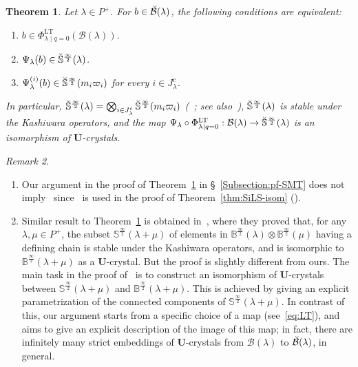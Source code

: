 \documentclass[10pt]{amsart}
\newtheorem{theo}{Theorem}[section]
\theoremstyle{definition}\newtheorem{defi}[theo]{Definition}
\theoremstyle{remark}\newtheorem{rema}[theo]{Remark}
\newcommand{\U}{\mathbf{U}}
\newcommand{\si}{\frac{\infty}{2}}
\DeclareMathOperator{\LT}{LT}
\begin{document}
\goodbreak
\begin{theo} \label{thm:SMT}
Let $\lambda \in P^+$. 
For $b \in \Breve{\mathcal{B}}(\lambda)$, 
the following conditions are equivalent:
\begin{enumerate}[label=(\arabic*)]
\item\label{Theo3.4_1}
$b \in \Phi_{\lambda \mid q=0}^{\LT }(\mathcal{B}(\lambda))$.
\item\label{Theo3.4_2}
$\Psi_{\lambda}(b) \in \Breve{\mathbb{S}}^{\si}(\lambda)$. 
\item\label{Theo3.4_3}
$\Psi_{\lambda}^{(i)}(b) \in \Breve{\mathbb{S}}^{\si}(m_i \varpi_i)$
for every $i \in J_{\lambda}^c$.
\end{enumerate}
In particular, 
$\Breve{\mathbb{S}}^{\si}(\lambda) = \bigotimes_{i \in J_{\lambda}^c}\Breve{\mathbb{S}}^{\si}(m_i \varpi_i)$ 
(\cf~\cite[Remark~4.17]{BN04}; see also~\cite[Conjecture~13.1~(iii)]{K02}), 
$\Breve{\mathbb{S}}^{\si}(\lambda)$ 
is stable under the Kashiwara operators, 
and the map 
$\Psi_{\lambda} \circ \Phi_{\lambda \mid q=0}^{\LT } : \mathcal{B}(\lambda) \rightarrow \Breve{\mathbb{S}}^{\si}(\lambda)$ 
is an isomorphism of $\U$-crystals.
\end{theo}

\goodbreak
\begin{rema}\ \\[-1.2em]
\begin{enumerate}[label=(\arabic*)]
\item\label{Rema3.5_1}
Our argument in the proof of Theorem~\ref{thm:SMT} in \S~\ref{Subsection:pf-SMT} 
does not imply~\cite[Conjecture~13.1~(iii)]{K02} 
since~\cite[Remark~4.17]{BN04}
is used in the proof of 
Theorem~\ref{thm:SiLS-isom}
(\cite[Theorems~3.1.5 and~3.2.1]{INS16}). 
\item\label{Rema3.5_2}
Similar result to Theorem~\ref{thm:SMT} is obtained in~\cite[Theorem~3.1]{KNS}, 
where they proved that, 
for any $\lambda , \mu \in P^+$, 
the subset 
$\mathbb{S}^{\si}(\lambda + \mu)$
of elements in 
$\mathbb{B}^{\si}(\lambda) \otimes \mathbb{B}^{\si}(\mu)$
having a defining chain is stable under the Kashiwara operators, 
and is isomorphic to 
$\mathbb{B}^{\si}(\lambda + \mu)$
as a $\U$-crystal. 
But the proof is slightly different from ours.
The main task in the proof of~\cite[Theorem~3.1]{KNS}
is to construct an isomorphism of $\U$-crystals between 
$\mathbb{S}^{\si}(\lambda + \mu)$
and 
$\mathbb{B}^{\si}(\lambda + \mu)$.
This is achieved by giving an explicit parametrization of the 
connected components of $\mathbb{S}^{\si}(\lambda + \mu)$.
In contrast of this, our argument starts from a specific choice of a map (see~\eqref{eq:LT}), 
and aims to give an explicit description of the image of this map; 
in fact, there are infinitely many strict embeddings of $\U$-crystals from
$\mathcal{B}(\lambda)$
to
$\Breve{\mathcal{B}}(\lambda)$, 
in general.
\end{enumerate}
\end{rema}
\end{document}
